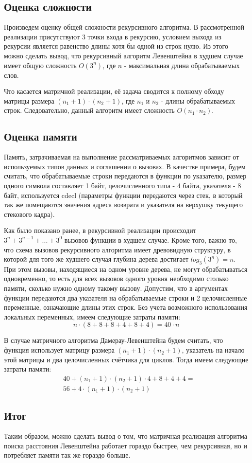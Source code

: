 \subsection{Оценка сложности}
Произведем оценку общей сложности рекурсивного алгоритма. В рассмотренной реализации присутствуют 3 точки входа в рекурсию, условием выхода из рекурсии является равенство длины хотя бы одной из строк нулю. Из этого можно сделать вывод, что рекурсивный алгоритм Левенштейна в худшем случае имеет общую сложность \(O(3^n)\), где \(n\) - максимальная длина обрабатываемых слов.

Что касается матричной реализации, её задача сводится к полному обходу матрицы размера \((n_1+1)\cdot{}(n_2+1)\), где \(n_1\) и \(n_2\) - длины обрабатываемых строк. Следовательно, данный алгоритм имеет сложность \(O(n_1\cdot{}n_2)\).

\subsection{Оценка памяти}
Память, затрачиваемая на выполнение рассматриваемых алгоритмов зависит от используемых типов данных и соглашении о вызовах. В качестве примера, будем считать, что обрабатываемые строки передаются в функции по указателю, размер одного символа составляет 1 байт, целочисленного типа - 4 байта, указателя - 8 байт, используется cdecl (параметры функции передаются через стек, в который так же помещаются значения адреса возврата и указателя на верхушку текущего стекового кадра).

Как было показано ранее, в рекурсивной реализации происходит \(3^n + 3^{n-1} + ... + 3^0\) вызовов функции в худшем случае. Кроме того, важно то, что схема вызовов рекурсивного алгоритма имеет древовидную структуру, в которой для того же худшего случая глубина дерева достигает \(log_3(3^n) = n\). При этом вызовы, находящиеся на одном уровне дерева, не могут обрабатываться одновременно, то есть для всех вызовов одного уровня необходимо столько памяти, сколько нужно одному такому вызову. Допустим, что в аргументах функции передаются два указателя на обрабатываемые строки и 2 целочисленные переменные, означающие длины этих строк. Без учета возможного использования локальных переменных, имеем следующие затраты памяти:
\begin{equation}
    n \cdot{} (8+8 + 8+4 + 8+4) = 40 \cdot n
\end{equation}

В случае матричного алгоритма Дамерау-Левенштейна будем считать, что функция использует матрицу размера \((n_1+1)\cdot{}(n_2+1)\), указатель на начало этой матрицы и два целочисленных счётчика для циклов. Тогда имеем следующие затраты памяти:
\begin{equation}
    \begin{split}
    & 40 + (n_1+1)\cdot{}(n_2+1)\cdot{}4 + 8 + 4 + 4 = \\
    & 56 + 4\cdot{}(n_1+1)\cdot{}(n_2+1)
    \end{split}
\end{equation}

\subsection{Итог}
Таким образом, можно сделать вывод о том, что матричная реализация алгоритма поиска расстояния Левенштейна работает гораздо быстрее, чем рекурсивная, но и потребляет памяти так же гораздо больше.

